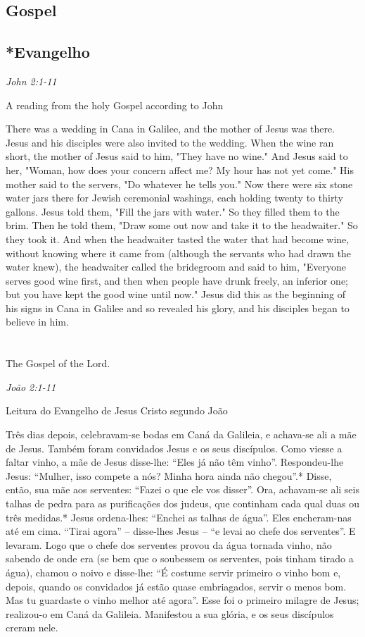 \documentclass[10pt,a4]{article}
\newcommand \subsect[2] {\subsection*{#1} \switchcolumn \subsection*{#2} \switchcolumn*}
\begin{document}
\begin{paracol}{2}

 \subsect{Gospel}{*Evangelho}

 \textit{John 2:1-11}

\hspace{2em} A reading from the holy Gospel according to John 

There was a wedding in Cana in Galilee, and the mother of Jesus was there.
Jesus and his disciples were also invited to the wedding.
When the wine ran short, the mother of Jesus said to him, "They have no wine."
And Jesus said to her, "Woman, how does your concern affect me? My hour has not yet come."
His mother said to the servers, "Do whatever he tells you."
Now there were six stone water jars there for Jewish ceremonial washings, each holding twenty to thirty gallons.
Jesus told them, "Fill the jars with water." So they filled them to the brim.
Then he told them, "Draw some out now and take it to the headwaiter." So they took it.
And when the headwaiter tasted the water that had become wine, without knowing where it came from (although the servants who had drawn the water knew), the headwaiter called the bridegroom
and said to him, "Everyone serves good wine first, and then when people have drunk freely, an inferior one; but you have kept the good wine until now."
Jesus did this as the beginning of his signs in Cana in Galilee and so revealed his glory, and his disciples began to believe in him.\\
\\\\
The Gospel of the Lord.


 \switchcolumn


 \textit{João 2:1-11}

 \hspace{2em} Leitura do Evangelho de Jesus Cristo segundo Jo\~ao

Três dias depois, celebravam-se bodas em Caná da Galileia, e achava-se ali a mãe de Jesus.
Também foram convidados Jesus e os seus discípulos.
Como viesse a faltar vinho, a mãe de Jesus disse-lhe: “Eles já não têm vinho”.
Respondeu-lhe Jesus: “Mulher, isso compete a nós? Minha hora ainda não chegou”.*
Disse, então, sua mãe aos serventes: “Fazei o que ele vos disser”.
Ora, achavam-se ali seis talhas de pedra para as purificações dos judeus, que continham cada qual duas ou três medidas.*
Jesus ordena-lhes: “Enchei as talhas de água”. Eles encheram-nas até em cima.
“Tirai agora” – disse-lhes Jesus – “e levai ao chefe dos serventes”. E levaram.
Logo que o chefe dos serventes provou da água tornada vinho, não sabendo de onde era (se bem que o soubessem os serventes, pois tinham tirado a água), chamou o noivo
e disse-lhe: “É costume servir primeiro o vinho bom e, depois, quando os convidados já estão quase embriagados, servir o menos bom. Mas tu guardaste o vinho me­lhor até agora”.
Esse foi o primeiro milagre de Jesus; realizou-o em Caná da Galileia. Manifestou a sua glória, e os seus discípulos creram nele.\\


\end{paracol}
\end{document}

